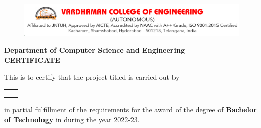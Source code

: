 \thispagestyle{fancy}

\begin{center}
\begin{figure}[h!]
	\centering
	
\includegraphics[scale=0.35]{Pictures/vce.png}
\end{figure}

	
	\textbf{Department of Computer Science and Engineering}\\
	\vspace{0.5cm}
	\Large{\textbf{CERTIFICATE}}
\end{center}

%

%

\vspace{0.3cm}

\noindent
\fontsize{12pt}{24pt}\selectfont This is to certify that the project titled \textbf{\thesistitle} is carried out by
\begin{center}

\begin{table}[h!]
	\centering
	\begin{tabular}{l l}
		\textbf{\studentA} & \textbf{\rollA }\\ [0.075in]
		\textbf{\studentB} & \textbf{\rollB} \\ [0.075in]
		\textbf{\studentC} & \textbf{\rollC}
	\end{tabular}
\end{table}
\end{center}

\noindent
in partial fulfillment of the requirements for the award of the degree of \textbf{Bachelor of Technology} in \textbf{\thesisdept} during the year 2022-23.



